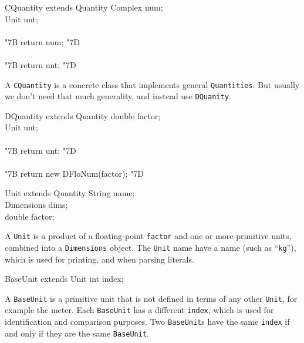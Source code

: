 \documentclass[twocolumn]{article}
\newcommand{\LBr}{\char"7B}
\newcommand{\RBr}{\char"7D}
\begin{document}
\begin{Class}{CQuantity}{ extends Quantity}
Complex num;\\
Unit unt;\\
\\
{\LBr} return num; {\RBr}\\
\\
{\LBr} return unt; {\RBr}\\
\end{Class}

A {\tt CQuantity} is a concrete class that implements general
{\tt Quantities}.  But usually we don't need that much generality,
and instead use {\tt DQuanity}.

\begin{Class}{DQuantity}{ extends Quantity}
double factor;\\
Unit unt;\\
\\
{\LBr} return unt; {\RBr}\\
\\
{\LBr} return new DFloNum(factor); {\RBr}\\
\end{Class}

\begin{Class}{Unit}{ extends Quantity}
String name; \\
Dimensions dims;\\
double factor;\\
\end{Class}

A {\tt Unit} is a product of a floating-point {\tt factor}
and one or more primitive units, combined into a {\tt Dimensions} object.
The {\tt Unit} name have a name (such as ``{\tt kg}''), which is
used for printing, and when parsing literals.

\begin{Class}{BaseUnit}{ extends Unit}
int index;\\
\end{Class}

A {\tt BaseUnit} is a primitive unit that is not
defined in terms of any other {\tt Unit}, for example the meter.
Each {\tt BaseUnit} has a different {\tt index}, which is used
for identification and comparison purposes.  Two {\tt BaseUnit}s
have the same {\tt index} if and only if they are the same {\tt BaseUnit}.
\end{document}
